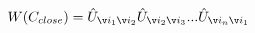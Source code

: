 \begin{equation}
W(C_{close})= \hat U_{\v i_1\v i_2}\hat U_{\v i_2\v i_3}...\hat U_{\v i_n\v i_1}
\end{equation} 
